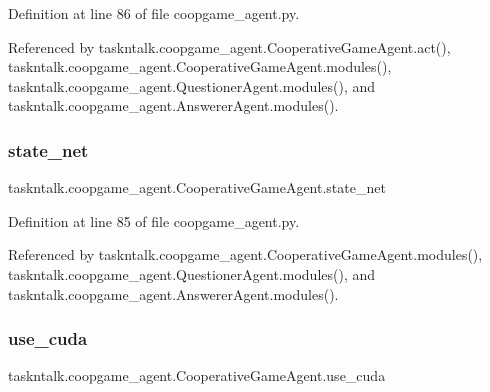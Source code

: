 Definition at line 86 of file coopgame\+\_\+agent.\+py.



Referenced by taskntalk.\+coopgame\+\_\+agent.\+Cooperative\+Game\+Agent.\+act(), taskntalk.\+coopgame\+\_\+agent.\+Cooperative\+Game\+Agent.\+modules(), taskntalk.\+coopgame\+\_\+agent.\+Questioner\+Agent.\+modules(), and taskntalk.\+coopgame\+\_\+agent.\+Answerer\+Agent.\+modules().

\mbox{\label{classtaskntalk_1_1coopgame__agent_1_1CooperativeGameAgent_a96326af2599078efb35a4c8d3a9a68dc}} 
\subsubsection{\texorpdfstring{state\+\_\+net}{state\_net}}
{\footnotesize\ttfamily taskntalk.\+coopgame\+\_\+agent.\+Cooperative\+Game\+Agent.\+state\+\_\+net}



Definition at line 85 of file coopgame\+\_\+agent.\+py.



Referenced by taskntalk.\+coopgame\+\_\+agent.\+Cooperative\+Game\+Agent.\+modules(), taskntalk.\+coopgame\+\_\+agent.\+Questioner\+Agent.\+modules(), and taskntalk.\+coopgame\+\_\+agent.\+Answerer\+Agent.\+modules().

\mbox{\label{classtaskntalk_1_1coopgame__agent_1_1CooperativeGameAgent_a69175c42c76b2d7957786410dc38cdb4}} 
\subsubsection{\texorpdfstring{use\+\_\+cuda}{use\_cuda}}
{\footnotesize\ttfamily taskntalk.\+coopgame\+\_\+agent.\+Cooperative\+Game\+Agent.\+use\+\_\+cuda}



